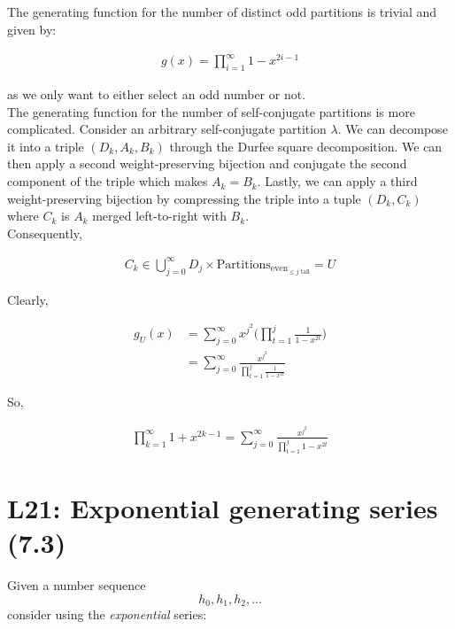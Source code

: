 \documentclass{report}
\begin{document}
{The generating function for the number of distinct odd partitions
is trivial and given by:

\begin{align*}
    g(x) = \prod_{i=1}^{\infty} 1 - x^{2i-1}
\end{align*}

as we only want to either select an odd number or not. \\

The generating function for the number of self-conjugate partitions
is more complicated. Consider an arbitrary self-conjugate partition
$\lambda$. We can decompose it into a triple $(D_k, A_k, B_k)$ through
the Durfee square decomposition. We can then apply a second weight-preserving
bijection and conjugate the second component of the triple which makes
$A_k = B_k$. Lastly, we can apply a third weight-preserving bijection
by compressing the triple into a tuple $(D_k, C_k)$ where $C_k$ is
$A_k$ merged left-to-right with $B_k$. \\

Consequently,

\begin{align*}
    C_k \in \bigcup_{j=0}^{\infty} D_j \times \text{Partitions}_{\text{even}_{\le j \text { tall}}} = U
\end{align*}

Clearly,

\begin{align*}
    g_{U}(x) & = \sum_{j=0}^{\infty} x^{j^2} \Big ( \prod_{t=1}^{j} \frac{1}{1 - x^{2t}} \Big ) \\
             & = \sum_{j=0}^{\infty} \frac{x^{j^2}}{\prod_{t=1}^{j} \frac{1}{1 - x^{2t}}}
\end{align*}

So,

\begin{align*}
    \prod_{k=1}^{\infty} 1 + x^{2k - 1} = \sum_{j=0}^{\infty} \frac{x^{j^2}}{\prod_{t=1}^{j} 1 - x^{2t}}
\end{align*}


\section{L21: Exponential generating series (7.3)}

Given a number sequence $$h_0, h_1, h_2, \dots$$ consider
using the \textit{exponential} series:


}
\end{document}
